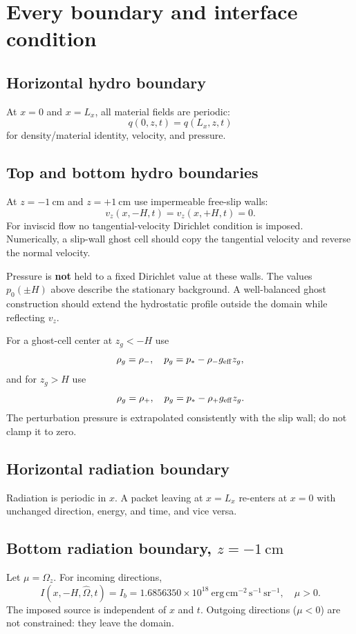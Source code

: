\documentclass[11pt]{article}
\newcommand{\Oh}{\hat{\Omega}}
\begin{document}
\section{Every boundary and interface condition}

\subsection{Horizontal hydro boundary}
At $x=0$ and $x=L_x$, all material fields are periodic:
\begin{equation}
q(0,z,t)=q(L_x,z,t)
\end{equation}
for density/material identity, velocity, and pressure.

\subsection{Top and bottom hydro boundaries}
At $z=-1\ \mathrm{cm}$ and $z=+1\ \mathrm{cm}$ use impermeable free-slip walls:
\begin{equation}
\boxed{v_z(x,-H,t)=v_z(x,+H,t)=0.}
\end{equation}
For inviscid flow no tangential-velocity Dirichlet condition is imposed. Numerically, a slip-wall ghost cell should copy the tangential velocity and reverse the normal velocity.

Pressure is \textbf{not} held to a fixed Dirichlet value at these walls. The values $p_0(\pm H)$ above describe the stationary background. A well-balanced ghost construction should extend the hydrostatic profile outside the domain while reflecting $v_z$.

For a ghost-cell center at $z_g<-H$ use
\begin{equation}
\rho_g=\rho_-,\quad p_g=p_*-\rho_-g_{\rm eff}z_g,
\end{equation}
and for $z_g>H$ use
\begin{equation}
\rho_g=\rho_+,\quad p_g=p_*-\rho_+g_{\rm eff}z_g.
\end{equation}
The perturbation pressure is extrapolated consistently with the slip wall; do not clamp it to zero.

\subsection{Horizontal radiation boundary}
Radiation is periodic in $x$. A packet leaving at $x=L_x$ re-enters at $x=0$ with unchanged direction, energy, and time, and vice versa.

\subsection{Bottom radiation boundary, $z=-1\ \mathrm{cm}$}
Let $\mu=\Omega_z$. For incoming directions,
\begin{equation}
\boxed{I(x,-H,\Oh,t)=I_b=1.6856350\times10^{18}\ \mathrm{erg\,cm^{-2}\,s^{-1}\,sr^{-1}},\quad \mu>0.}
\end{equation}
The imposed source is independent of $x$ and $t$. Outgoing directions ($\mu<0$) are not constrained: they leave the domain.
\end{document}
